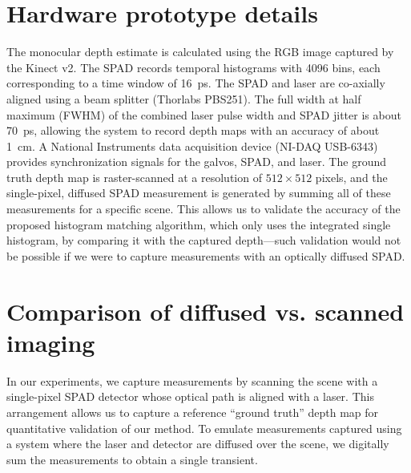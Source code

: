 \documentclass[runningheads]{llncs}
\newcommand{\edit}[1]{\textcolor{black}{#1}}
\begin{document}
\section{Hardware prototype details}
The monocular depth estimate is calculated using the RGB image captured by the
Kinect v2. The SPAD records temporal histograms with 4096 bins, each
corresponding to a time window of 16~ps. The SPAD and laser are co-axially
aligned using a beam splitter (Thorlabs PBS251). The full width at half maximum
(FWHM) of the combined laser pulse width and SPAD jitter is about 70~ps,
allowing the system to record depth maps with an accuracy of about 1~cm. A
National Instruments data acquisition device (NI-DAQ USB-6343) provides
synchronization signals for the galvos, SPAD, and laser. The ground truth depth
map is raster-scanned at a resolution of $512 \times 512$ pixels, and the
single-pixel, diffused SPAD measurement is generated by summing all of these
measurements for a specific scene. This allows us to validate the accuracy of
the proposed histogram matching algorithm, which only uses the integrated single
histogram, by comparing it with the captured depth---such validation would not
be possible if we were to capture measurements with an optically diffused SPAD.

\section{Comparison of diffused vs. scanned imaging}
In our experiments, we capture measurements by scanning the scene with a
single-pixel SPAD detector whose optical path is aligned with a laser. This
arrangement allows us to capture a reference ``ground truth'' depth map for
quantitative validation of our method. To emulate measurements captured using a
system where the laser and detector are diffused over the scene, we digitally
sum the measurements to obtain a single transient. 

\end{document}
